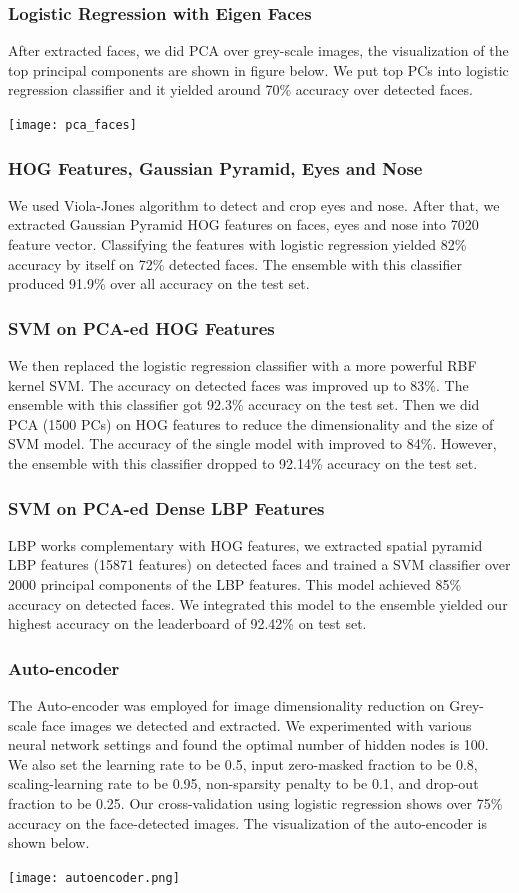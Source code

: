 \subsubsection{Logistic Regression with Eigen Faces}
After extracted faces, we did PCA over grey-scale images, the visualization of the top principal components are shown in figure below. We put top PCs into logistic regression classifier and it yielded around 70\% accuracy over detected faces. \\
\begin{center}
\texttt{[image: pca\_faces]}
\end{center}
\subsubsection{HOG Features, Gaussian Pyramid, Eyes and Nose}
We used Viola-Jones algorithm to detect and crop eyes and nose. After that, we extracted Gaussian Pyramid HOG features on faces, eyes and nose into 7020 feature vector. Classifying the features with logistic regression yielded 82\% accuracy by itself on 72\% detected faces. The ensemble with this classifier produced 91.9\% over all accuracy on the test set. 
\subsubsection{SVM on PCA-ed HOG Features}
We then replaced the logistic regression classifier with a more powerful RBF kernel SVM. The accuracy on detected faces was improved up to 83\%. The ensemble with this classifier got 92.3\% accuracy on the test set.  Then we did PCA (1500 PCs) on HOG features to reduce the dimensionality and the size of SVM model. The accuracy of the single model with improved to 84\%. However, the ensemble with this classifier dropped to 92.14\% accuracy on the test set. 
\subsubsection{SVM on PCA-ed Dense LBP Features}
LBP works complementary with HOG features, we extracted spatial pyramid LBP features (15871 features) on detected faces and trained a SVM classifier over 2000 principal components of the LBP features. This model achieved 85\% accuracy on detected faces. We integrated this model to the ensemble yielded our highest accuracy on the leaderboard of 92.42\% on test set.

\subsubsection{Auto-encoder}
The Auto-encoder was employed for image dimensionality reduction on Grey-scale face images we detected and extracted. We experimented with various neural network settings and found the optimal number of hidden nodes is 100. We also set the learning rate to be 0.5, input zero-masked fraction to be 0.8, scaling-learning rate to be 0.95, non-sparsity penalty to be 0.1, and drop-out fraction to be 0.25. Our cross-validation using logistic regression shows over 75\% accuracy on the face-detected images.
The visualization of the auto-encoder is shown below. 
\begin{center}
\texttt{[image: autoencoder.png]}
\end{center}
